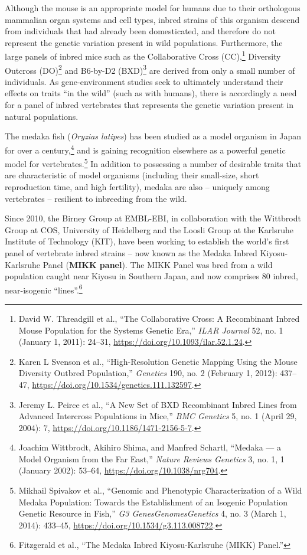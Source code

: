 \documentclass[
  9pt,
]{book}
\begin{document}
Although the mouse is an appropriate model for humans due to their orthologous mammalian organ systems and cell types, inbred strains of this organism descend from individuals that had already been domesticated, and therefore do not represent the genetic variation present in wild populations. Furthermore, the large panels of inbred mice such as the Collaborative Cross (CC),\footnote{David W. Threadgill et al., {``The {Collaborative Cross}: {A Recombinant Inbred Mouse Population} for the {Systems Genetic Era},''} \emph{ILAR Journal} 52, no. 1 (January 1, 2011): 24--31, \url{https://doi.org/10.1093/ilar.52.1.24}.} Diversity Outcross (DO)\footnote{Karen L Svenson et al., {``High-{Resolution Genetic Mapping Using} the {Mouse Diversity Outbred Population},''} \emph{Genetics} 190, no. 2 (February 1, 2012): 437--47, \url{https://doi.org/10.1534/genetics.111.132597}.} and B6-by-D2 (BXD)\footnote{Jeremy L. Peirce et al., {``A New Set of {BXD} Recombinant Inbred Lines from Advanced Intercross Populations in Mice,''} \emph{BMC Genetics} 5, no. 1 (April 29, 2004): 7, \url{https://doi.org/10.1186/1471-2156-5-7}.} are derived from only a small number of individuals. As gene-environment studies seek to ultimately understand their effects on traits ``in the wild'' (such as with humans), there is accordingly a need for a panel of inbred vertebrates that represents the genetic variation present in natural populations.

The medaka fish (\emph{Oryzias latipes}) has been studied as a model organism in Japan for over a century,\footnote{Joachim Wittbrodt, Akihiro Shima, and Manfred Schartl, {``Medaka --- a Model Organism from the Far East,''} \emph{Nature Reviews Genetics} 3, no. 1, 1 (January 2002): 53--64, \url{https://doi.org/10.1038/nrg704}.} and is gaining recognition elsewhere as a powerful genetic model for vertebrates.\footnote{Mikhail Spivakov et al., {``Genomic and {Phenotypic Characterization} of a {Wild Medaka Population}: {Towards} the {Establishment} of an {Isogenic Population Genetic Resource} in {Fish},''} \emph{G3 Genes\textbar Genomes\textbar Genetics} 4, no. 3 (March 1, 2014): 433--45, \url{https://doi.org/10.1534/g3.113.008722}.} In addition to possessing a number of desirable traits that are characteristic of model organisms (including their small-size, short reproduction time, and high fertility), medaka are also -- uniquely among vertebrates -- resilient to inbreeding from the wild.

Since 2010, the Birney Group at EMBL-EBI, in collaboration with the Wittbrodt Group at COS, University of Heidelberg and the Loosli Group at the Karlsruhe Institute of Technology (KIT), have been working to establish the world's first panel of vertebrate inbred strains -- now known as the Medaka Inbred Kiyosu-Karlsruhe Panel (\textbf{MIKK panel}). The MIKK Panel was bred from a wild population caught near Kiyosu in Southern Japan, and now comprises 80 inbred, near-isogenic ``lines''.\footnote{Fitzgerald et al., {``The {Medaka Inbred Kiyosu-Karlsruhe} ({MIKK}) Panel.''}}
\end{document}
